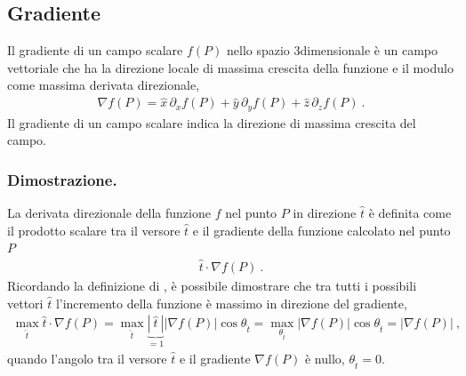 \documentclass[letterpaper,10pt,italian]{jupyterBook}
\begin{document}
\subsection{Gradiente}
\label{\detokenize{ch/vector-calculus/derivatives:gradiente}}\label{\detokenize{ch/vector-calculus/derivatives:vector-calculus-derivatives-gradient}}
\sphinxAtStartPar
{} Il gradiente di un campo scalare \(f(P)\) nello spazio 3\sphinxhyphen{}dimensionale è un campo vettoriale che ha la direzione locale di massima crescita della funzione e il modulo come massima derivata direzionale,
\begin{equation*}
\begin{split}\nabla f(P) = \hat{x} \, \partial_x f(P) + \hat{y} \, \partial_y f(P) + \hat{z} \, \partial_z f(P) \ . \end{split}
\end{equation*}
\sphinxAtStartPar
{} Il gradiente di un campo scalare indica la direzione  di massima crescita del campo.
\subsubsection*{Dimostrazione.}

\sphinxAtStartPar
La derivata direzionale della funzione \(f\) nel punto \(P\) in direzione \(\hat{t}\) è definita come il prodotto scalare tra il versore \(\hat{t}\) e il gradiente della funzione calcolato nel punto \(P\)
\begin{equation*}
\begin{split}\hat{t} \cdot \nabla f(P) \ .\end{split}
\end{equation*}
\sphinxAtStartPar
Ricordando la definizione di , è possibile dimostrare che tra tutti i possibili vettori \(\hat{t}\) l’incremento della funzione è massimo in direzione del gradiente,
\begin{equation*}
\begin{split}\max_{\hat{t}} \hat{t} \cdot \nabla f(P) = \max_{\hat{t}} \underbrace{|\ \hat{t} \ |}_{=1} |\nabla f(P)| \cos \theta_{\hat{t}} = \max_{\theta_{\hat{t}}} |\nabla f(P)| \cos \theta_{\hat{t}} = |\nabla f(P)| \ ,\end{split}
\end{equation*}
\sphinxAtStartPar
quando l’angolo tra il versore \(\hat{t}\) e il gradiente \(\nabla f(P)\) è nullo, \(\theta_{\hat{t}} = 0\).
\end{document}
